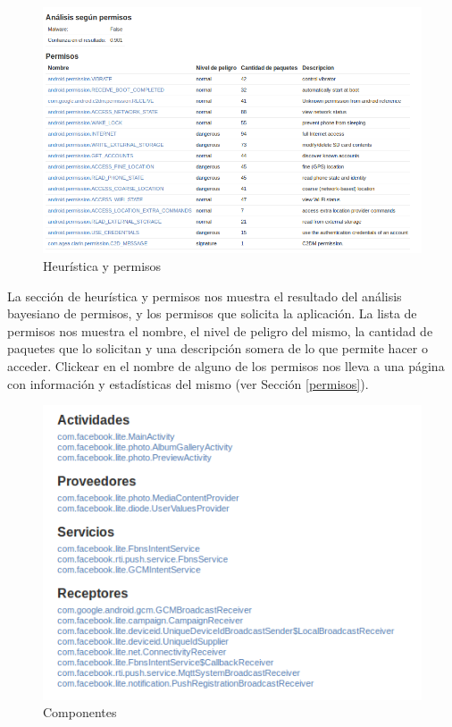 \documentclass[11pt]{article}
\begin{document}
\begin{figure}[H]
\begin{center}
\includegraphics[width=\textwidth]{graphics/marvin_app2.png}
\caption{Heurística y permisos}
\end{center}
\end{figure}
La sección de heurística y permisos nos muestra el resultado del análisis bayesiano de permisos, y los permisos que solicita la aplicación. La lista de permisos nos muestra el nombre, el nivel de peligro del mismo, la cantidad de paquetes que lo solicitan y una descripción somera de lo que permite hacer o acceder. Clickear en el nombre de alguno de los permisos nos lleva a una página con información y estadísticas del mismo (ver Sección \ref{permisos}).
\begin{figure}[H]
\begin{center}
\includegraphics[width=.8\textwidth]{graphics/marvin_app3.png}
\caption{Componentes}
\end{center}
\end{figure}
 
\end{document}

